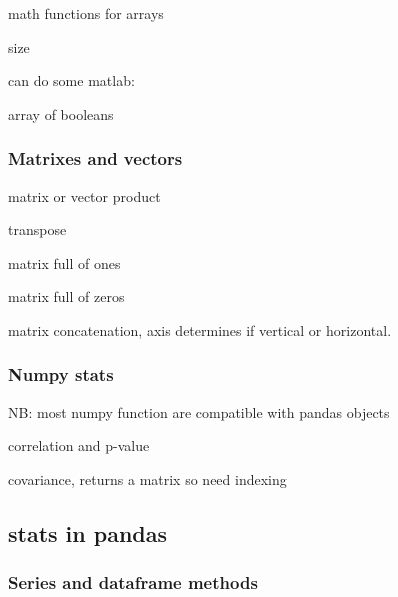 			 math functions for arrays


			 size

			can do some matlab:


			 array of booleans


		\subsubsection{Matrixes and vectors}


			 matrix or vector product

			 transpose

			 matrix full of ones

			 matrix full of zeros

			 matrix concatenation, axis determines if vertical or horizontal.

		\subsubsection{Numpy stats}

			NB: most numpy function are compatible with pandas objects
			


			 correlation and p-value

			 covariance, returns a matrix so need indexing


	\subsection{stats in pandas}
		
		\subsubsection{Series and dataframe methods}




